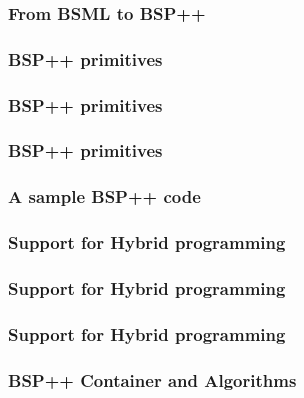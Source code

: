 \frame
{
  \frametitle{From BSML to BSP++}
}


\frame
{
  \frametitle{BSP++ primitives}
}

\frame
{
  \frametitle{BSP++ primitives}
}

\frame
{
  \frametitle{BSP++ primitives}
}

\frame
{
  \frametitle{A sample BSP++ code}
}

\frame
{
  \frametitle{Support for Hybrid programming}
}

\frame
{
  \frametitle{Support for Hybrid programming}
}

\frame
{
  \frametitle{Support for Hybrid programming}
}

\frame
{
  \frametitle{BSP++ Container and Algorithms}
}


